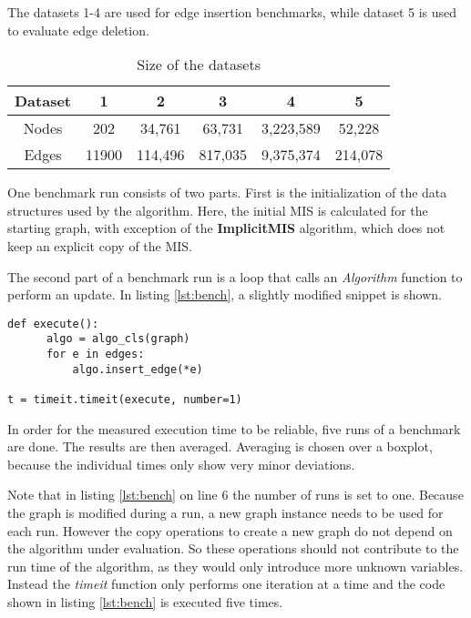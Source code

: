 \documentclass[letterpaper,12pt]{article}
\begin{document}
The datasets 1-4 are used for edge insertion benchmarks, while dataset 5 is
used to evaluate edge deletion.

\begin{table}[h]
  \caption{Size of the datasets}
  \label{tab:datasets}
  \centering
  \setlength{\extrarowheight}{0.3em}
  \begin{tabular}{|c|c|c|c|c|c|}
    \hline
    Dataset & 1 & 2 & 3 & 4 & 5 \\
    \hline
    \hline
    Nodes & 202 & 34,761 & 63,731 & 3,223,589 & 52,228 \\
    \hline
    Edges & 11900 & 114,496 & 817,035 & 9,375,374 & 214,078 \\
    \hline
  \end{tabular}
\end{table}

One benchmark run consists of two parts. First
is the initialization of the data structures used by the algorithm. Here, the
initial MIS is calculated for the starting graph, with exception of the
\textbf{ImplicitMIS} algorithm, which does not keep an explicit copy of the
MIS.

The second part of a benchmark run is a loop that calls an \textit{Algorithm} function
to perform an update. In listing \ref{lst:bench}, a slightly modified snippet is shown.

\begin{lstlisting}[label={lst:bench}, caption=Benchmark Code Snippet]
def execute():
      algo = algo_cls(graph)
      for e in edges:
          algo.insert_edge(*e)

t = timeit.timeit(execute, number=1)
\end{lstlisting}

In order for the measured execution time to be reliable, five runs of a
benchmark are done.  The results are then averaged. Averaging is chosen over a
boxplot, because the individual times only show very minor deviations.

Note that in listing \ref{lst:bench} on line 6 the number of runs is set to
one. Because the graph is modified during a run, a new graph instance needs to
be used for each run. However the copy operations to create a new graph do not
depend on the algorithm under evaluation. So these operations should not
contribute to the run time of the algorithm, as they would only introduce more
unknown variables.  Instead the \textit{timeit} function only performs one
iteration at a time and the code shown in listing \ref{lst:bench} is executed
five times.
\end{document}

